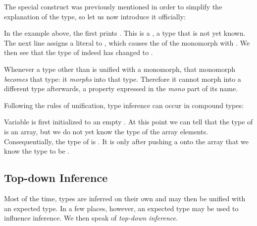 The special construct  was previously mentioned in order to simplify the explanation of the  type, so let us now introduce it officially:


In the example above, the first  prints . This is a , a type that is not yet known. The next line  assigns a  literal to , which causes the  of the monomorph with . We then see that the type of  indeed has changed to .

Whenever a type other than  is unified with a monomorph, that monomorph \emph{becomes} that type: it \emph{morphs} into that type. Therefore it cannot morph into a different type afterwards, a property expressed in the \emph{mono} part of its name.

Following the rules of unification, type inference can occur in compound types:

Variable  is first initialized to an empty . At this point we can tell that the type of  is an array, but we do not yet know the type of the array elements. Consequentially, the type of  is . It is only after pushing a  onto the array that we know the type to be .


\subsection{Top-down Inference}
\label{type-system-top-down-inference}

Most of the time, types are inferred on their own and may then be unified with an expected type. In a few places, however, an expected type may be used to influence inference. We then speak of \emph{top-down inference}.


